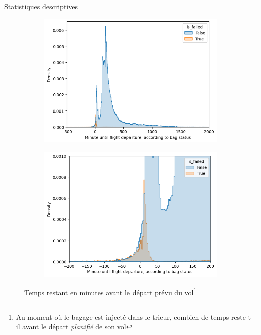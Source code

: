\documentclass{beamer}
\begin{document}
\begin{frame}{Statistiques descriptives}
    \begin{figure}[ht]
      \centering
      \begin{subfigure}{0.48\textwidth}
        \includegraphics[width=\linewidth]{Minute until flight departure_2.png}
      \end{subfigure}
      \hfill
      \begin{subfigure}{0.48\textwidth}
        \includegraphics[width=\linewidth]{Minute until flight departure_3.png}
      \end{subfigure}
      \caption{Temps restant en minutes avant le départ prévu du vol\footnote{Au moment où le bagage est injecté dans le trieur, combien de temps reste-t-il avant le départ \textit{planifié} de son vol}}
      \label{fig:Minute until flight departure distribution according to bag status}
    \end{figure}

\end{frame}
\end{document}
